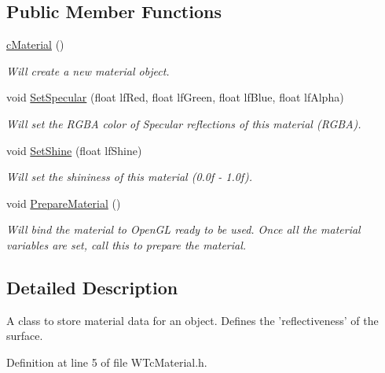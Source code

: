 \subsection*{Public Member Functions}
\begin{DoxyCompactItemize}
\item 
\hyperlink{classc_material_acccfb25dd445a8279f0452dbe53f5079}{cMaterial} ()
\begin{DoxyCompactList}\small\item\em Will create a new material object. \item\end{DoxyCompactList}\item 
void \hyperlink{classc_material_aa08385e14417f023b8529ec491f5df38}{SetSpecular} (float lfRed, float lfGreen, float lfBlue, float lfAlpha)
\begin{DoxyCompactList}\small\item\em Will set the RGBA color of Specular reflections of this material (RGBA). \item\end{DoxyCompactList}\item 
void \hyperlink{classc_material_a7b3a800d84e017b955fd9faa9d7fda15}{SetShine} (float lfShine)
\begin{DoxyCompactList}\small\item\em Will set the shininess of this material (0.0f -\/ 1.0f). \item\end{DoxyCompactList}\item 
void \hyperlink{classc_material_af08e6f579a6c0e41490721320355a2f4}{PrepareMaterial} ()
\begin{DoxyCompactList}\small\item\em Will bind the material to OpenGL ready to be used. Once all the material variables are set, call this to prepare the material. \item\end{DoxyCompactList}\end{DoxyCompactItemize}


\subsection{Detailed Description}
A class to store material data for an object. Defines the 'reflectiveness' of the surface. 

Definition at line 5 of file WTcMaterial.h.



